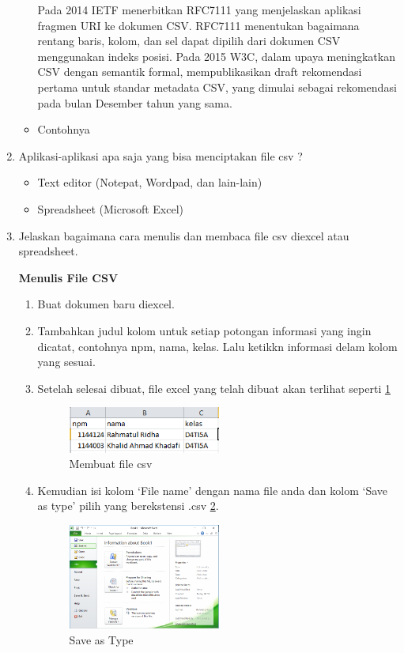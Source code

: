 \begin{enumerate}
\begin{itemize}
     Pada 2014 IETF menerbitkan RFC7111 yang menjelaskan aplikasi fragmen URI ke dokumen CSV. RFC7111 menentukan bagaimana rentang baris, kolom, dan sel dapat dipilih dari dokumen CSV menggunakan indeks posisi. Pada 2015 W3C, dalam upaya meningkatkan CSV dengan semantik formal, mempublikasikan draft rekomendasi pertama untuk standar metadata CSV, yang dimulai sebagai rekomendasi pada bulan Desember tahun yang sama.

     \item Contohnya

       
     \end{itemize}

 \item Aplikasi-aplikasi apa saja yang bisa menciptakan file csv ?

       \begin{itemize}
         \item Text editor (Notepat, Wordpad, dan lain-lain)
         \item Spreadsheet (Microsoft Excel)
       \end{itemize}

 \item Jelaskan bagaimana cara menulis dan membaca file csv diexcel atau spreadsheet.

    \textbf{Menulis File CSV}
       \begin{enumerate}
	   \item Buat dokumen baru diexcel.
       \item Tambahkan judul kolom untuk setiap potongan informasi yang ingin dicatat, contohnya npm, nama, kelas. Lalu ketikkn informasi delam kolom yang sesuai.
	   \item Setelah selesai dibuat, file excel yang telah dibuat akan terlihat seperti \ref{CSV}
		
		\begin{figure}[H]	\includegraphics[width=5cm]{figures/4/1144124/Chapter4/1.png}
		\centering
        \caption{Membuat file csv}
        \label{CSV}
		\end{figure}
		
	   \item Kemudian isi kolom `File name' dengan nama file anda dan kolom `Save as type' pilih yang berekstensi .csv \ref{save}.
		\begin{figure}[H] \includegraphics[width=5cm]{figures/4/1144124/Chapter4/2.png}
			\centering
        \caption{Save as Type}
        \label{save}
		\end{figure}


\end{enumerate}
\end{enumerate}
